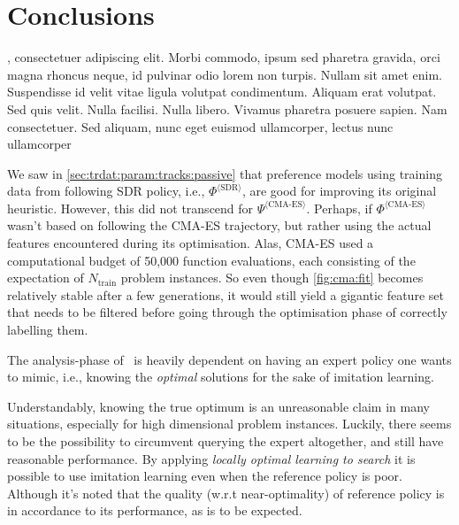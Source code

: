 
\chapter{Conclusions}\label{ch:conclusions} 

, consectetuer adipiscing elit. Morbi commodo, ipsum sed pharetra gravida, orci magna rhoncus neque, id pulvinar odio lorem non turpis. Nullam sit amet enim. Suspendisse id velit vitae ligula volutpat condimentum. Aliquam erat volutpat. Sed quis velit. Nulla facilisi. Nulla libero. Vivamus pharetra posuere sapien. Nam consectetuer. Sed aliquam, nunc eget euismod ullamcorper, lectus nunc ullamcorper 


We saw in \cref{sec:trdat:param:tracks:passive} that preference models using 
training data from following SDR policy, i.e., $\Phi^{\langle \text{SDR} 
\rangle}$, are good for improving its original heuristic. However, this did not 
transcend for $\Psi^{\langle \text{CMA-ES} \rangle}$. 
Perhaps, if $\Phi^{\langle \text{CMA-ES} \rangle}$ wasn't based on following 
the CMA-ES trajectory, but rather using the actual features encountered during 
its optimisation. Alas, CMA-ES used a computational budget of 50,000 function 
evaluations, each consisting of the expectation of $N_{\text{train}}$ problem 
instances. So even though \cref{fig:cma:fit} becomes relatively stable after a 
few generations, it would still yield a gigantic feature set that needs to be 
filtered before going through the optimisation phase of correctly labelling 
them.

The analysis-phase of \Alice\ is heavily dependent on having an expert 
policy one wants to mimic, i.e., knowing the \emph{optimal} solutions for the 
sake of imitation learning. 

Understandably, knowing the true optimum is an unreasonable claim in many 
situations, especially for high dimensional problem instances. 
Luckily, there seems to be the possibility to circumvent querying the expert 
altogether, and still have reasonable performance. 
By applying \emph{locally optimal learning to search} \citep{ChangKADL15} it is 
possible to use imitation learning even when the reference policy is poor. 
Although it's noted that the quality (w.r.t near-optimality) of reference 
policy is in accordance to its performance, as is to be expected. 
